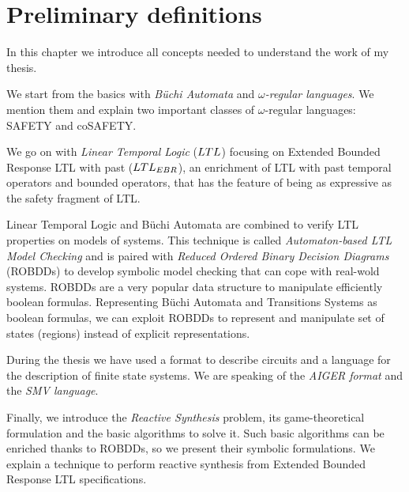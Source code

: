 
\chapter{Preliminary definitions} \label{chapt:preliminary-definitions}

In this chapter we introduce all concepts needed to understand the work of my thesis.

We start from the basics with \textit{B{\"u}chi Automata} and \textit{$\omega$-regular languages}. We mention them and explain two important classes of $\omega$-regular languages: SAFETY and coSAFETY.

We go on with \textit{Linear Temporal Logic} ($LTL$) focusing on Extended Bounded Response LTL with past ($LTL_{EBR}$), an enrichment of LTL with past temporal operators and bounded operators, that has the feature of being as expressive as the safety fragment of LTL.

Linear Temporal Logic and B{\"u}chi Automata are combined to verify LTL properties on models of systems. This technique is called \textit{Automaton-based LTL Model Checking} and is paired with \textit{Reduced Ordered Binary Decision Diagrams} (ROBDDs) to develop symbolic model checking that can cope with real-wold systems.
ROBDDs are a very popular data structure to manipulate efficiently boolean formulas. Representing B{\"u}chi Automata and Transitions Systems as boolean formulas, we can exploit ROBDDs to represent and manipulate set of states (regions) instead of explicit representations. 

During the thesis we have used a format to describe circuits and a language for the description of finite state systems. We are speaking of the \textit{AIGER format} and the \textit{SMV language}.

Finally, we introduce the \textit{Reactive Synthesis} problem, its game-theoretical formulation and the basic algorithms to solve it. Such basic algorithms can be enriched thanks to ROBDDs, so we present their symbolic formulations. We explain a technique to perform reactive synthesis from Extended Bounded Response LTL specifications.









